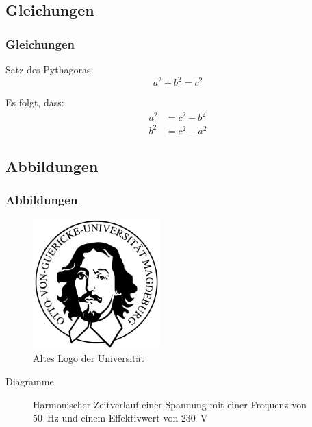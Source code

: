 \documentclass{beamer}
\begin{document}
\subsection{Gleichungen}

\begin{frame}
	\frametitle<presentation>{Gleichungen}
	\begin{block}{Satz des Pythagoras:}
		\begin{equation}
			a^2 + b^2 = c^2 \label{eq:pythogoras}
		\end{equation}	\end{block}
	\begin{block}{Es folgt, dass:}
		\begin{align}
			a^2 &= c^2 - b^2 \\
			b^2 &= c^2 - a^2
		\end{align} 	
 	\end{block}
\end{frame}

\subsection{Abbildungen}

\begin{frame}
	\frametitle<presentation>{Abbildungen}
	\begin{figure}[!t]
		\centering
			\includegraphics[height=5cm]{bilder/unilogo}
		\caption{Altes Logo der Universität}
		\label{fig:unilogo}
	\end{figure}
\end{frame}

\begin{frame}{Diagramme}
	\begin{figure}[!t]
		\centering
		\caption{Harmonischer Zeitverlauf einer Spannung mit einer Frequenz von \SI{50}{\hertz} und einem Effektivwert von \SI{230}{\volt}}
		\label{fig:u_t_sinus}
	\end{figure}
\end{frame}
\end{document}
